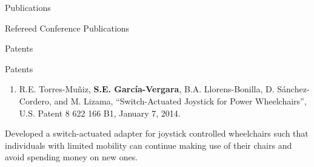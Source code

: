 \documentclass{resume} %
\newcommand{\sectionspace}{\vspace{3mm}}
\newcommand{\Sergio}{\textbf{S. Garc\'{i}a-Vergara}}
\begin{document}
\begin{rSection}{Publications}
\begin{rSubsection}{Refereed Conference Publications}{}{}{}
\begin{enumerate}

\end{enumerate}
\end{rSubsection}


\end{rSection}










\sectionspace

\begin{rSection}{Patents}

\begin{rSubsection}{Patents}{}{}{}
\item
\begin{enumerate}
\item R.E. Torres-Mu\~{n}iz, \textbf{S.E. Garc\'{i}a-Vergara},
  B.A. Llorens-Bonilla, D. S\'{a}nchez-Cordero, and M. Lizama, ``Switch-Actuated
  Joystick for Power Wheelchairs'', U.S. Patent 8 622 166 B1, January 7, 2014.
\end{enumerate}

Developed a switch-actuated adapter for joystick controlled wheelchairs such
that individuals with limited mobility can continue making use of their chairs
and avoid spending money on new ones.

\end{rSubsection}
\end{rSection}







\iffalse
\sectionspace
\begin{rSection}{References}
Available upon request.
\end{rSection}
\fi


\end{document}
